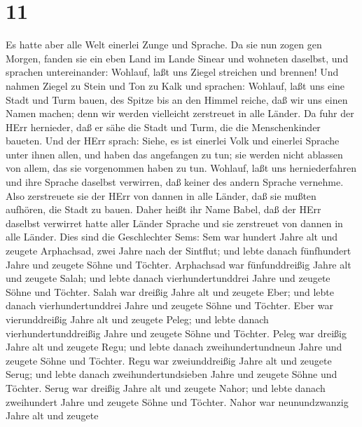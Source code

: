 \hypertarget{section-10}{%
\section{11}\label{section-10}}

 Es hatte aber alle Welt einerlei Zunge und Sprache.
 Da sie nun zogen gen Morgen, fanden sie ein eben Land im
Lande Sinear und wohneten daselbst,  und sprachen
untereinander: Wohlauf, laßt uns Ziegel streichen und brennen! Und
nahmen Ziegel zu Stein und Ton zu Kalk  und sprachen:
Wohlauf, laßt uns eine Stadt und Turm bauen, des Spitze bis an den
Himmel reiche, daß wir uns einen Namen machen; denn wir werden
vielleicht zerstreuet in alle Länder.  Da fuhr der HErr
hernieder, daß er sähe die Stadt und Turm, die die Menschenkinder
baueten.  Und der HErr sprach: Siehe, es ist einerlei Volk
und einerlei Sprache unter ihnen allen, und haben das angefangen zu tun;
sie werden nicht ablassen von allem, das sie vorgenommen haben zu tun.
 Wohlauf, laßt uns herniederfahren und ihre Sprache daselbst
verwirren, daß keiner des andern Sprache vernehme.  Also
zerstreuete sie der HErr von dannen in alle Länder, daß sie mußten
aufhören, die Stadt zu bauen.  Daher heißt ihr Name Babel,
daß der HErr daselbst verwirret hatte aller Länder Sprache und sie
zerstreuet von dannen in alle Länder.  Dies sind die
Geschlechter Sems: Sem war hundert Jahre alt und zeugete Arphachsad,
zwei Jahre nach der Sintflut;  und lebte danach fünfhundert
Jahre und zeugete Söhne und Töchter.  Arphachsad war
fünfunddreißig Jahre alt und zeugete Salah;  und lebte
danach vierhundertunddrei Jahre und zeugete Söhne und Töchter.
 Salah war dreißig Jahre alt und zeugete Eber;
 und lebte danach vierhundertunddrei Jahre und zeugete
Söhne und Töchter.  Eber war vierunddreißig Jahre alt und
zeugete Peleg;  und lebte danach vierhundertunddreißig
Jahre und zeugete Söhne und Töchter.  Peleg war dreißig
Jahre alt und zeugete Regu;  und lebte danach
zweihundertundneun Jahre und zeugete Söhne und Töchter. 
Regu war zweiunddreißig Jahre alt und zeugete Serug;  und
lebte danach zweihundertundsieben Jahre und zeugete Söhne und Töchter.
 Serug war dreißig Jahre alt und zeugete Nahor;
 und lebte danach zweihundert Jahre und zeugete Söhne und
Töchter.  Nahor war neunundzwanzig Jahre alt und zeugete
